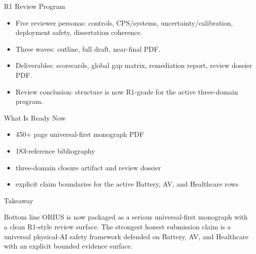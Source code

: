 \documentclass[aspectratio=169]{beamer}
\begin{document}
\begin{frame}{R1 Review Program}
  \begin{itemize}
    \item Five reviewer personas: controls, CPS/systems, uncertainty/calibration, deployment safety, dissertation coherence.
    \item Three waves: outline, full draft, near-final PDF.
    \item Deliverables: scorecards, global gap matrix, remediation report, review dossier PDF.
    \item Review conclusion: structure is now R1-grade for the active three-domain program.
  \end{itemize}
\end{frame}

\begin{frame}{What Is Ready Now}
  \begin{itemize}
    \item 450+ page universal-first monograph PDF
    \item 183-reference bibliography
    \item three-domain closure artifact and review dossier
    \item explicit claim boundaries for the active Battery, AV, and Healthcare rows
  \end{itemize}
\end{frame}

\begin{frame}{Takeaway}
  \begin{block}{Bottom line}
    ORIUS is now packaged as a serious universal-first monograph with a clean R1-style review surface. The strongest honest submission claim is a universal physical-AI safety framework defended on Battery, AV, and Healthcare with an explicit bounded evidence surface.
  \end{block}
\end{frame}
\end{document}
